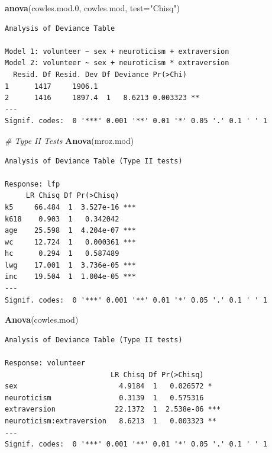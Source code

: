\documentclass[
]{article}
\newenvironment{Shaded}{\begin{snugshade}}{\end{snugshade}}
\newcommand{\CommentTok}[1]{\textcolor[rgb]{0.56,0.35,0.01}{\textit{#1}}}
\newcommand{\DataTypeTok}[1]{\textcolor[rgb]{0.13,0.29,0.53}{#1}}
\newcommand{\FloatTok}[1]{\textcolor[rgb]{0.00,0.00,0.81}{#1}}
\newcommand{\KeywordTok}[1]{\textcolor[rgb]{0.13,0.29,0.53}{\textbf{#1}}}
\newcommand{\NormalTok}[1]{#1}
\newcommand{\StringTok}[1]{\textcolor[rgb]{0.31,0.60,0.02}{#1}}
\begin{document}
\begin{Shaded}
\begin{Highlighting}[]
\KeywordTok{anova}\NormalTok{(cowles.mod}\FloatTok{.0}\NormalTok{, cowles.mod, }\DataTypeTok{test=}\StringTok{"Chisq"}\NormalTok{)}
\end{Highlighting}
\end{Shaded}

\begin{verbatim}
Analysis of Deviance Table

Model 1: volunteer ~ sex + neuroticism + extraversion
Model 2: volunteer ~ sex + neuroticism * extraversion
  Resid. Df Resid. Dev Df Deviance Pr(>Chi)   
1      1417     1906.1                        
2      1416     1897.4  1   8.6213 0.003323 **
---
Signif. codes:  0 '***' 0.001 '**' 0.01 '*' 0.05 '.' 0.1 ' ' 1
\end{verbatim}

\begin{Shaded}
\begin{Highlighting}[]
\CommentTok{# Type II Tests }
\KeywordTok{Anova}\NormalTok{(mroz.mod)}
\end{Highlighting}
\end{Shaded}

\begin{verbatim}
Analysis of Deviance Table (Type II tests)

Response: lfp
     LR Chisq Df Pr(>Chisq)    
k5     66.484  1  3.527e-16 ***
k618    0.903  1   0.342042    
age    25.598  1  4.204e-07 ***
wc     12.724  1   0.000361 ***
hc      0.294  1   0.587489    
lwg    17.001  1  3.736e-05 ***
inc    19.504  1  1.004e-05 ***
---
Signif. codes:  0 '***' 0.001 '**' 0.01 '*' 0.05 '.' 0.1 ' ' 1
\end{verbatim}

\begin{Shaded}
\begin{Highlighting}[]
\KeywordTok{Anova}\NormalTok{(cowles.mod)}
\end{Highlighting}
\end{Shaded}

\begin{verbatim}
Analysis of Deviance Table (Type II tests)

Response: volunteer
                         LR Chisq Df Pr(>Chisq)    
sex                        4.9184  1   0.026572 *  
neuroticism                0.3139  1   0.575316    
extraversion              22.1372  1  2.538e-06 ***
neuroticism:extraversion   8.6213  1   0.003323 ** 
---
Signif. codes:  0 '***' 0.001 '**' 0.01 '*' 0.05 '.' 0.1 ' ' 1
\end{verbatim}
\end{document}
